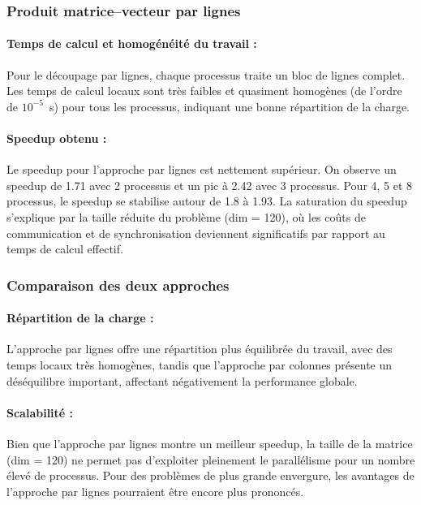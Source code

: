 \documentclass[a4paper,13pt]{book}
\begin{document}
\subsubsection{Produit matrice--vecteur par lignes}

\paragraph{Temps de calcul et homogénéité du travail :} 
Pour le découpage par lignes, chaque processus traite un bloc de lignes complet. Les temps de calcul locaux sont très faibles et quasiment homogènes (de l'ordre de $10^{-5}$~s) pour tous les processus, indiquant une bonne répartition de la charge.

\paragraph{Speedup obtenu :} 
Le speedup pour l'approche par lignes est nettement supérieur. On observe un speedup de 1.71 avec 2 processus et un pic à 2.42 avec 3 processus. Pour 4, 5 et 8 processus, le speedup se stabilise autour de 1.8 à 1.93. La saturation du speedup s'explique par la taille réduite du problème (dim = 120), où les coûts de communication et de synchronisation deviennent significatifs par rapport au temps de calcul effectif.

\subsubsection{Comparaison des deux approches}

\paragraph{Répartition de la charge :} 
L'approche par lignes offre une répartition plus équilibrée du travail, avec des temps locaux très homogènes, tandis que l'approche par colonnes présente un déséquilibre important, affectant négativement la performance globale.
\paragraph{Scalabilité :} 
Bien que l'approche par lignes montre un meilleur speedup, la taille de la matrice (dim = 120) ne permet pas d'exploiter pleinement le parallélisme pour un nombre élevé de processus. Pour des problèmes de plus grande envergure, les avantages de l'approche par lignes pourraient être encore plus prononcés.
\end{document}
